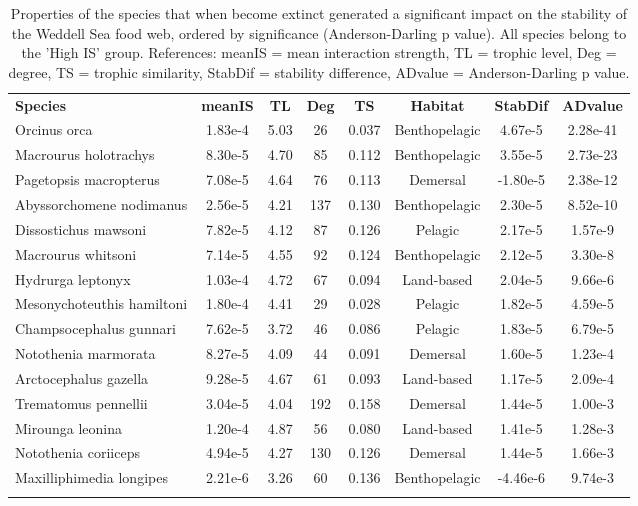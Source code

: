 \documentclass[gc, manuscript]{copernicus}
\begin{document}
\clearpage

\begin{table}[t]
\caption{Properties of the species that when become extinct generated a significant impact on the stability of the Weddell Sea food web, ordered by significance (Anderson-Darling p value). All species belong to the 'High IS' group.  References: meanIS = mean interaction strength, TL = trophic level, Deg = degree, TS = trophic similarity, StabDif = stability difference, ADvalue = Anderson-Darling p value.}
\begin{tabular}{l c c c c c c c}
\tophline

\textbf{Species} & \textbf{meanIS} & \textbf{TL} & \textbf{Deg} & \textbf{TS} & \textbf{Habitat} & \textbf{StabDif} & \textbf{ADvalue}\\
\middlehline
Orcinus orca & 1.83e-4 & 5.03 & 26 & 0.037 & Benthopelagic & 4.67e-5 & 2.28e-41 \\
\middlehline
Macrourus holotrachys & 8.30e-5 & 4.70 & 85 & 0.112 & Benthopelagic & 3.55e-5 & 2.73e-23 \\
\middlehline
Pagetopsis macropterus & 7.08e-5 & 4.64 & 76 & 0.113 & Demersal & -1.80e-5 & 2.38e-12 \\
\middlehline
Abyssorchomene nodimanus & 2.56e-5 & 4.21 & 137 & 0.130 & Benthopelagic & 2.30e-5 & 8.52e-10 \\
\middlehline
Dissostichus mawsoni & 7.82e-5 & 4.12 & 87 & 0.126 & Pelagic & 2.17e-5 & 1.57e-9 \\
\middlehline
Macrourus whitsoni & 7.14e-5 & 4.55 & 92 & 0.124 & Benthopelagic & 2.12e-5 & 3.30e-8 \\
\middlehline
Hydrurga leptonyx & 1.03e-4 & 4.72 & 67 & 0.094 & Land-based & 2.04e-5 & 9.66e-6 \\
\middlehline
Mesonychoteuthis hamiltoni & 1.80e-4 & 4.41 & 29 & 0.028 & Pelagic & 1.82e-5 & 4.59e-5 \\
\middlehline
Champsocephalus gunnari & 7.62e-5 & 3.72 & 46 & 0.086 & Pelagic & 1.83e-5 & 6.79e-5 \\
\middlehline
Notothenia marmorata & 8.27e-5 & 4.09 & 44 & 0.091 & Demersal & 1.60e-5 & 1.23e-4 \\
\middlehline
Arctocephalus gazella & 9.28e-5 & 4.67 & 61 & 0.093 & Land-based & 1.17e-5 & 2.09e-4 \\
\middlehline
Trematomus pennellii & 3.04e-5 & 4.04 & 192 & 0.158 & Demersal & 1.44e-5 & 1.00e-3 \\
\middlehline
Mirounga leonina & 1.20e-4 & 4.87 & 56 & 0.080 & Land-based & 1.41e-5 & 1.28e-3 \\
\middlehline
Notothenia coriiceps & 4.94e-5 & 4.27 & 130 & 0.126 & Demersal & 1.44e-5 & 1.66e-3 \\
\middlehline
Maxilliphimedia longipes & 2.21e-6 & 3.26 & 60 & 0.136 & Benthopelagic & -4.46e-6 & 9.74e-3 \\

\bottomhline
\end{tabular}
\end{table}
\end{document}
